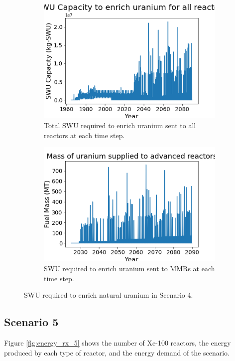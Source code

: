 \begin{figure}
    \centering
    \begin{subfigure}{0.4\textwidth}
        \centering
        \includegraphics[scale=0.3]{figures/totalswu_scenarios_4.png}
        \caption{Total \gls{SWU} required to enrich uranium sent to all reactors at each time step.}
        \label{fig:totalswu_4}
    \end{subfigure}
    \begin{subfigure}{0.4\textwidth}
        \centering
        \includegraphics[scale=0.3]{figures/advancedRX_fuelsupply_scenarios_4.png}
        \caption{\gls{SWU} required to enrich uranium sent to \glspl{MMR} at each time step.}
        \label{fig:haleuswu_4}
    \end{subfigure}
    \caption{\gls{SWU} required to enrich natural uranium in Scenario 4.}
    \label{fig:swu_4}
\end{figure}


\subsection{Scenario 5}
Figure \ref{fig:energy_rx_5} shows the number of Xe-100 reactors, the 
energy produced by each type of reactor, and the energy demand of the 
scenario. 

